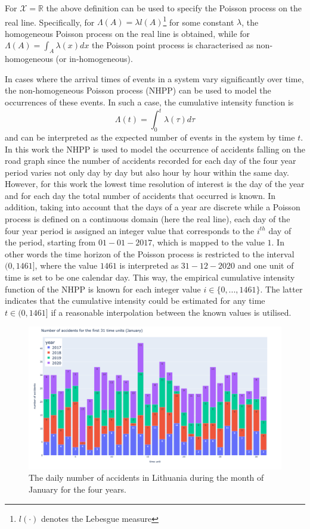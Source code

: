 \documentclass[12pt]{article}
\theoremstyle{definition}
\begin{document}
For $\mathcal{X}=\mathbb{R}$ the above definition can be used to specify the Poisson process on the real line. Specifically, for $\Lambda(A)=\lambda l(A)$\footnote{$l(\cdot)$ denotes the Lebesgue measure} for some constant $\lambda$, the homogeneous Poisson process on the real line is obtained, while for $\Lambda(A)=\int_A \lambda(x)dx$ the Poisson point process is characterised as non-homogeneous (or in-homogeneous).

In cases where the arrival times of events in a system vary significantly over time, the non-homogeneous Poisson process (NHPP) can be used to model the occurrences of these events. In such a case, the cumulative intensity function is 
\begin{equation}
    \Lambda(t) = \int_0^t \lambda(\tau)d\tau 
\end{equation}
and can be interpreted as the expected number of events in the system by time $t$. In this work the NHPP is used to model the occurrence of accidents falling on the road graph since the number of accidents recorded for each day of the four year period varies not only day by day but also hour by hour within the same day. However, for this work the lowest time resolution of interest is the day of the year and for each day the total number of accidents that occurred is known. In addition, taking into account that the days of a year are discrete while a Poisson process is defined on a continuous domain (here the real line), each day of the four year period is assigned an integer value that corresponds to the $i^{th}$ day of the period, starting from $01-01-2017$, which is mapped to the value $1$. In other words the time horizon of the Poisson process is restricted to the interval $(0, 1461]$, where the value $1461$ is interpreted as $31-12-2020$ and one unit of time is set to be one calendar day. This way, the empirical cumulative intensity function of the NHPP is known for each integer value $i\in \{0,...,1461\}$. The latter indicates that the cumulative intensity could be estimated for any time $t\in (0,1461]$ if a reasonable interpolation between the known values is utilised. 

\begin{figure}
    \centering
    \includegraphics[width=13.5cm]{images/stackedBarPlot.png}
    \caption{The daily number of accidents in Lithuania during the month of January for the four years.}
    \label{fig:January}
\end{figure}
\end{document}
